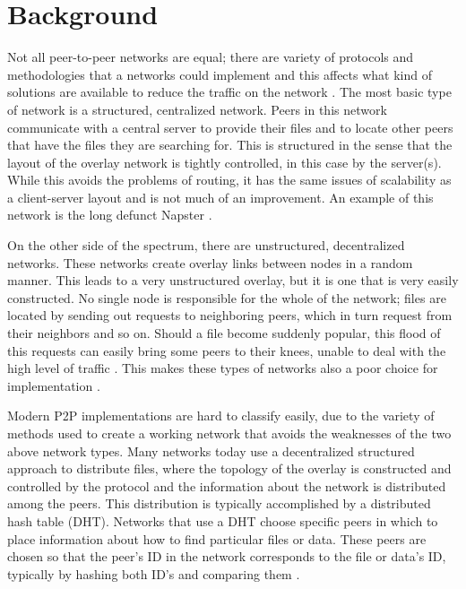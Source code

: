 \documentclass[10pt, conference, compsocconf, letterpaper]{IEEEtran} %
\begin{document}
\section{Background}
Not all peer-to-peer networks are equal; there are variety of protocols and methodologies that a networks could implement and this affects what kind of solutions are available to reduce the traffic on the network    \cite{SurveyCompare} \cite{Overview}.
The most basic type of network is a structured, centralized  network.  Peers in this network communicate with a central server to provide their files and to locate other peers that have the files they are searching for.  This is structured in the sense that the layout of the overlay network is tightly controlled, in this case by the server(s). While this avoids the problems of routing, it has the same issues of scalability as a client-server layout and is not much of an improvement. An example of this network is the long defunct Napster  \cite{SurveyCompare} \cite{Overview}.

On the other side of the spectrum, there are unstructured, decentralized networks.  These networks create overlay links between nodes in a random manner. This leads to a very unstructured overlay, but it is one that is very easily constructed.  No single node is responsible for the whole of the network;  files are located by sending out requests to neighboring peers, which in turn request from their neighbors and so on. Should a file become suddenly popular, this flood of this requests can easily bring some peers to their knees, unable to deal with the high level of traffic \cite{Lv:2002:SRU:514191.514206}.  This makes these types of networks also a poor choice for implementation \cite{Overview}.

Modern P2P implementations are hard to classify easily, due to the variety of methods used to create a working network that avoids the weaknesses of the two above network types.  Many networks today use a decentralized structured approach to distribute files, where the topology of the overlay is constructed and controlled by the protocol and the information about the network is distributed among the peers.  This distribution is typically accomplished by a distributed hash table (DHT).  Networks that use a DHT choose specific peers in which to place information about how to find particular files or data.  These peers are chosen so that the peer's ID in the network corresponds to the file or data's ID, typically by hashing both ID's and comparing them  \cite{SurveyCompare}. 
\end{document}
